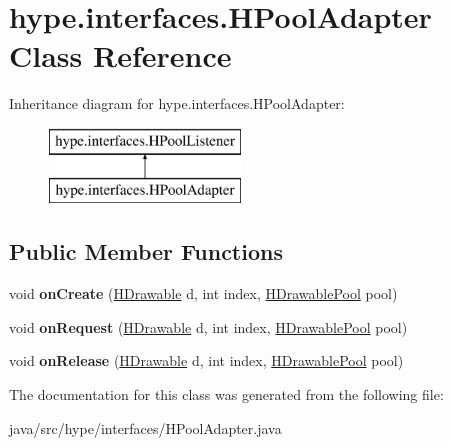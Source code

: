 \hypertarget{classhype_1_1interfaces_1_1_h_pool_adapter}{\section{hype.\-interfaces.\-H\-Pool\-Adapter Class Reference}
\label{classhype_1_1interfaces_1_1_h_pool_adapter}
}
Inheritance diagram for hype.\-interfaces.\-H\-Pool\-Adapter\-:\begin{figure}[H]
\begin{center}
\leavevmode
\includegraphics[height=2.000000cm]{classhype_1_1interfaces_1_1_h_pool_adapter}
\end{center}
\end{figure}
\subsection*{Public Member Functions}
\begin{DoxyCompactItemize}
\item 
\hypertarget{classhype_1_1interfaces_1_1_h_pool_adapter_a560a57ec5401b9382c171e080dea0025}{void {\bfseries on\-Create} (\hyperlink{classhype_1_1drawable_1_1_h_drawable}{H\-Drawable} d, int index, \hyperlink{classhype_1_1util_1_1_h_drawable_pool}{H\-Drawable\-Pool} pool)}\label{classhype_1_1interfaces_1_1_h_pool_adapter_a560a57ec5401b9382c171e080dea0025}

\item 
\hypertarget{classhype_1_1interfaces_1_1_h_pool_adapter_ad72027ec4db0bcf4565563fd02efce21}{void {\bfseries on\-Request} (\hyperlink{classhype_1_1drawable_1_1_h_drawable}{H\-Drawable} d, int index, \hyperlink{classhype_1_1util_1_1_h_drawable_pool}{H\-Drawable\-Pool} pool)}\label{classhype_1_1interfaces_1_1_h_pool_adapter_ad72027ec4db0bcf4565563fd02efce21}

\item 
\hypertarget{classhype_1_1interfaces_1_1_h_pool_adapter_a28b3444f3de61542af04f7accdedfec8}{void {\bfseries on\-Release} (\hyperlink{classhype_1_1drawable_1_1_h_drawable}{H\-Drawable} d, int index, \hyperlink{classhype_1_1util_1_1_h_drawable_pool}{H\-Drawable\-Pool} pool)}\label{classhype_1_1interfaces_1_1_h_pool_adapter_a28b3444f3de61542af04f7accdedfec8}

\end{DoxyCompactItemize}


The documentation for this class was generated from the following file\-:\begin{DoxyCompactItemize}
\item 
java/src/hype/interfaces/H\-Pool\-Adapter.\-java\end{DoxyCompactItemize}
